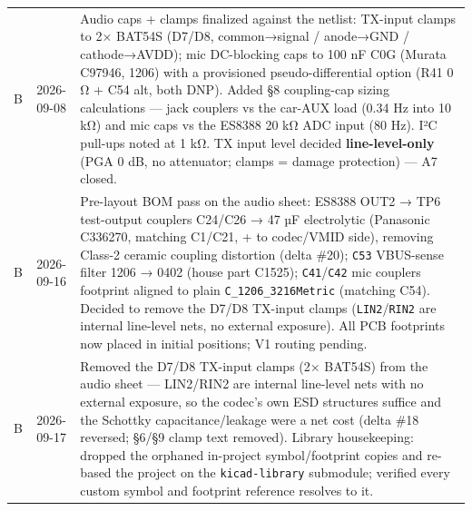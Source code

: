 \documentclass[11pt]{article}
\begin{document}
\begin{longtable}{@{}c c L{\dimexpr\linewidth-4.2cm}@{}}
B & 2026-09-08 & Audio caps + clamps finalized against the netlist: TX-input clamps to 2× BAT54S (D7/D8, common→signal / anode→GND / cathode→AVDD); mic DC-blocking caps to 100 nF C0G (Murata C97946, 1206) with a provisioned pseudo-differential option (R41 0 Ω + C54 alt, both DNP). Added §8 coupling-cap sizing calculations — jack couplers vs the car-AUX load (0.34 Hz into 10 kΩ) and mic caps vs the ES8388 20 kΩ ADC input (80 Hz). I²C pull-ups noted at 1 kΩ. TX input level decided \textbf{line-level-only} (PGA 0 dB, no attenuator; clamps = damage protection) — A7 closed. \\
B & 2026-09-16 & Pre-layout BOM pass on the audio sheet: ES8388 OUT2 → TP6 test-output couplers C24/C26 → 47 µF electrolytic (Panasonic C336270, matching C1/C21, + to codec/VMID side), removing Class-2 ceramic coupling distortion (delta \#20); \texttt{C53} VBUS-sense filter 1206 → 0402 (house part C1525); \texttt{C41}/\texttt{C42} mic couplers footprint aligned to plain \texttt{C\_1206\_3216Metric} (matching C54). Decided to remove the D7/D8 TX-input clamps (\texttt{LIN2}/\texttt{RIN2} are internal line-level nets, no external exposure). All PCB footprints now placed in initial positions; V1 routing pending. \\
B & 2026-09-17 & Removed the D7/D8 TX-input clamps (2× BAT54S) from the audio sheet — LIN2/RIN2 are internal line-level nets with no external exposure, so the codec's own ESD structures suffice and the Schottky capacitance/leakage were a net cost (delta \#18 reversed; §6/§9 clamp text removed). Library housekeeping: dropped the orphaned in-project symbol/footprint copies and re-based the project on the \texttt{kicad-library} submodule; verified every custom symbol and footprint reference resolves to it. \\
\bottomrule
\end{longtable}
\normalsize
\end{document}

